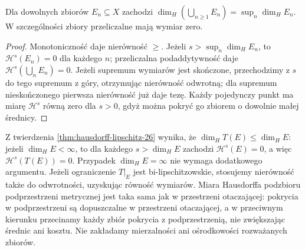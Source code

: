 \begin{wniosek}
\label{cor:hausdorff-union-26}
Dla dowolnych zbiorów $E_n\subseteq X$ zachodzi
$\dim_H(\bigcup_{n\ge1}E_n)=\sup_n\dim_HE_n$.
W szczególności zbiory przeliczalne mają wymiar zero.
\end{wniosek}
\begin{proof}
Monotoniczność daje nierówność $\ge$.
Jeżeli $s>\sup_n\dim_HE_n$, to
$\mathcal H^s(E_n)=0$ dla każdego $n$; przeliczalna
podaddytywność daje $\mathcal H^s(\bigcup_nE_n)=0$.
Jeżeli supremum wymiarów jest skończone, przechodzimy
z $s$ do tego supremum z góry, otrzymując nierówność
odwrotną; dla supremum nieskończonego pierwsza
nierówność już daje tezę. Każdy pojedynczy punkt ma miarę
$\mathcal H^s$ równą zero dla $s>0$, gdyż można
pokryć go zbiorem o dowolnie małej średnicy.
\end{proof}

\begin{uwaga}
Z twierdzenia \ref{thm:hausdorff-lipschitz-26} wynika, że
$\dim_H T(E)\le\dim_H E$: jeżeli $\dim_HE<\infty$,
to dla każdego $s>\dim_HE$ zachodzi $\mathcal H^s(E)=0$,
a więc $\mathcal H^s(T(E))=0$.
Przypadek $\dim_HE=\infty$ nie wymaga dodatkowego argumentu.
Jeżeli ograniczenie $T|_E$ jest bi-lipschitzowskie, stosujemy
nierówność także do odwrotności, uzyskując równość wymiarów.
Miara Hausdorffa podzbioru podprzestrzeni metrycznej jest
taka sama jak w przestrzeni otaczającej: pokrycia w podprzestrzeni
są dopuszczalne w przestrzeni otaczającej, a w przeciwnym kierunku
przecinamy każdy zbiór pokrycia z podprzestrzenią,
nie zwiększając średnic ani kosztu.
Nie zakładamy mierzalności ani ośrodkowości rozważanych zbiorów.
\end{uwaga}

